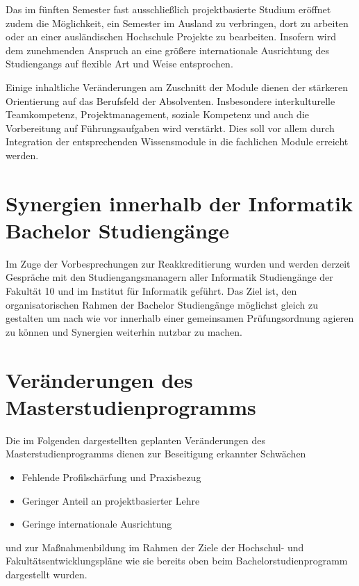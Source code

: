 Das im fünften Semester fast ausschließlich projektbasierte Studium
eröffnet zudem die Möglichkeit, ein Semester im Ausland zu verbringen,
dort zu arbeiten oder an einer ausländischen Hochschule Projekte zu
bearbeiten. Insofern wird dem zunehmenden Anspruch an eine größere
internationale Ausrichtung des Studiengangs auf flexible Art und Weise
entsprochen.

Einige inhaltliche Veränderungen am Zuschnitt der Module dienen der
stärkeren Orientierung auf das Berufsfeld der Absolventen. Insbesondere
interkulturelle Teamkompetenz, Projektmanagement, soziale Kompetenz und
auch die Vorbereitung auf Führungsaufgaben wird verstärkt. Dies soll vor
allem durch Integration der entsprechenden Wissensmodule in die
fachlichen Module erreicht werden.

\section{Synergien innerhalb der Informatik Bachelor
Studiengänge}\label{synergien-innerhalb-der-informatik-bachelor-studienguxe4nge}

Im Zuge der Vorbesprechungen zur Reakkreditierung wurden und werden
derzeit Gespräche mit den Studiengangsmanagern aller Informatik
Studiengänge der Fakultät 10 und im Institut für Informatik geführt. Das
Ziel ist, den organisatorischen Rahmen der Bachelor Studiengänge
möglichst gleich zu gestalten um nach wie vor innerhalb einer
gemeinsamen Prüfungsordnung agieren zu können und Synergien weiterhin
nutzbar zu machen.

\section{Veränderungen des
Masterstudienprogramms}\label{veruxe4nderungen-des-masterstudienprogramms}

Die im Folgenden dargestellten geplanten Veränderungen des
Masterstudienprogramms dienen zur Beseitigung erkannter Schwächen

\begin{itemize}
\tightlist
\item
  Fehlende Profilschärfung und Praxisbezug
\item
  Geringer Anteil an projektbasierter Lehre
\item
  Geringe internationale Ausrichtung
\end{itemize}

und zur Maßnahmenbildung im Rahmen der Ziele der Hochschul- und
Fakultätsentwicklungspläne wie sie bereits oben beim
Bachelorstudienprogramm dargestellt wurden.


